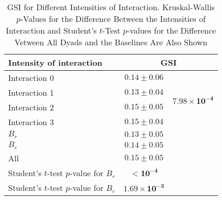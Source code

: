 \begin{table}[!t]
\caption{GSI for Different Intensities of Interaction. Kruskal-Wallis $p$-Values for the Difference Between the Intensities of Interaction and Student's $t$-Test $p$-values for the Difference Vetween All Dyads and the Baselines Are Also Shown\label{tab:gsi_interaction}}
\begin{tabular}{lcc}
\toprule
Intensity of interaction & \multicolumn{2}{c}{GSI}  \\
\midrule
Interaction 0 & $0.14 \pm 0.06$ & \multirow{4}{*}{$\mathbf{7.98 \times 10^{-4}}$} \\
Interaction 1 & $0.13 \pm 0.04$ & \\
Interaction 2 & $0.15 \pm 0.05$ & \\
Interaction 3 & $0.15 \pm 0.04$ & \\
\midrule
$B_r$ & $0.13 \pm 0.05$ & \\
$B_c$ & $0.14 \pm 0.05$ & \\
\midrule
All & $0.15 \pm 0.05$ & \\
\midrule
Student's $t$-test $p$-value for $B_r$ & $\mathbf{< 10^{-4}}$ &\\
Student's $t$-test $p$-value for $B_c$ & $\mathbf{1.69 \times 10^{-3}}$  &\\
\bottomrule
\end{tabular}
\end{table}
